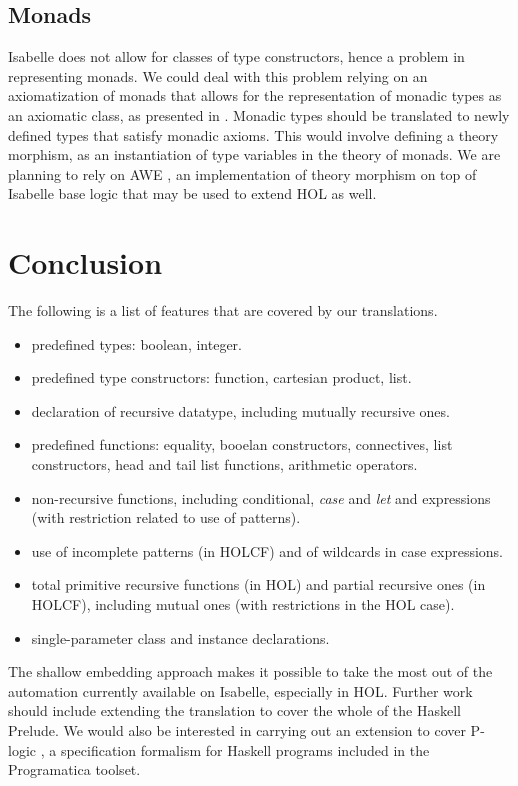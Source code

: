 \documentclass{llncs}
\begin{document}
\subsection{Monads}
\label{sec:Monads}

Isabelle does not allow for classes of type constructors, hence a
problem in representing monads. We could deal with this problem
relying on an axiomatization of monads that allows for the
representation of monadic types as an axiomatic class, as presented in
\cite{Lueth}. Monadic types should be translated to newly defined
types that satisfy monadic axioms. This would involve defining a
theory morphism, as an instantiation of type variables in the theory
of monads. We are planning to rely on AWE \cite{AWE}, an
implementation of theory morphism on top of Isabelle base logic that
may be used to extend HOL as well.


\section{Conclusion}

The following is a list of features that are covered by our
translations.

\begin{itemize} 
\item predefined types: boolean, integer.
\item predefined type constructors: function, cartesian product, list.
\item declaration of recursive datatype, including mutually recursive ones.
\item predefined functions: equality, booelan constructors,
  connectives, list constructors, head and tail list functions,
  arithmetic operators.
\item non-recursive functions, including conditional, \emph{case} and
  \emph{let} and expressions (with restriction related to use of
  patterns).
\item use of incomplete patterns (in HOLCF) and of wildcards in case
  expressions.
\item total primitive recursive functions (in HOL)
and partial recursive ones (in HOLCF), including mutual ones (with
restrictions in the HOL case).
\item single-parameter class and instance declarations.
\end{itemize}


The shallow embedding approach makes it possible to take the most out
of the automation currently available on Isabelle, especially in HOL.
Further work should include extending the translation to cover the
whole of the Haskell Prelude. We would also be interested in carrying
out an extension to cover P-logic \cite{KiebPl}, a specification
formalism for Haskell programs included in the Programatica toolset.




\end{document}
